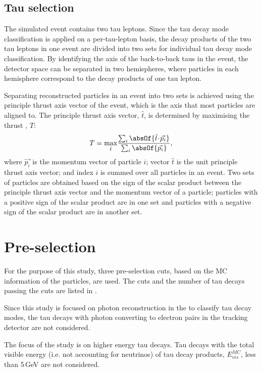 \subsection{Tau selection}

The simulated \eeToTauTau event contains two tau leptons. Since the tau decay mode classification is applied on a per-tau-lepton basis, the decay products of the two tau leptons in one event are divided into two sets for individual tau decay mode classification. By identifying the axis of the back-to-back taus in the event, the detector space can be separated in two hemispheres, where particles in each hemisphere correspond to the decay products of one tau lepton.

Separating reconstructed particles in an event into two sets is achieved using the principle thrust axis vector of the event, which is the axis that most particles are aligned to. The principle thrust axis vector, $\hat{t}$, is determined by maximising the thrust \cite{PhysRevLett.39.1587}, $T$:
\begin{equation}
T = \max_{\hat{t}}\!\frac{\sum_{i}\absOf{\hat{t}\!\cdot\!\vec{p_{i}}}}{\sum_{i}\absOf{\vec{p_{i}}}},
\end{equation}
where $\vec{p_{i}}$ is the momentum vector of particle $i$;  vector $\hat{t}$ is the unit principle thrust axis vector; and index $i$ is summed over all particles in an event. Two sets of particles are obtained based on the sign of the scalar product between the principle thrust axis vector  and the momentum vector of a particle; particles with a positive sign of the scalar product are in one set and particles with a negative sign of the scalar product are in another set.


\section{Pre-selection}
\label{sec:tauPreSel}


For the purpose of this study, three pre-selection cuts, based on the MC information of the particles,  are used. The cuts and the number of tau decays passing the cuts are listed in .

Since this study is focused on photon reconstruction in the \ECAL to classify tau decay modes, the tau decays with photon converting to electron pairs in the tracking detector are not considered.

The focus of the study is on higher energy tau decays. Tau decays with the total visible energy (i.e. not accounting for neutrinos) of tau decay products, $E_{vis}^{MC}$, less than 5\,GeV are not considered.



